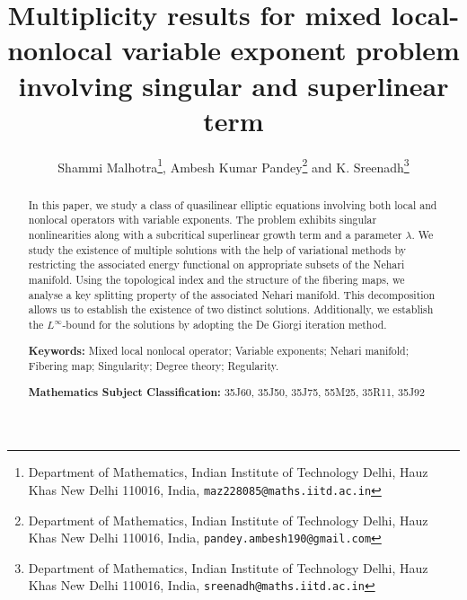 \documentclass[11pt]{article}
\title{Multiplicity results for mixed local-nonlocal variable exponent problem involving singular and superlinear term}
\author{Shammi Malhotra\thanks{Department of Mathematics, Indian Institute of Technology Delhi, Hauz Khas New Delhi 110016,  India, \texttt{maz228085@maths.iitd.ac.in}}, Ambesh Kumar Pandey\thanks{Department of Mathematics, Indian Institute of Technology Delhi, Hauz Khas New Delhi 110016,  India, \texttt{pandey.ambesh190@gmail.com}} and K. Sreenadh\thanks{Department of Mathematics, Indian Institute of Technology Delhi, Hauz Khas New Delhi 110016,  India, \texttt{sreenadh@maths.iitd.ac.in}}}
\date{}
\newcommand{\la} {\lambda}
\newcommand{\noi} {\noindent}
\begin{document}
 

\date{}
\maketitle     
 

\allowdisplaybreaks
 
 



 
 \begin{abstract}
\noi In this paper, we study a class of quasilinear elliptic equations involving both local and nonlocal operators with variable exponents. The problem exhibits singular nonlinearities along with a subcritical superlinear growth term and a parameter $\la$. We study the existence of multiple solutions with the help of variational methods by restricting the associated energy functional on appropriate subsets of the Nehari manifold. Using the topological index and the structure of the fibering maps, we analyse a key splitting property of the associated Nehari manifold. This decomposition allows us to establish the existence of two distinct solutions. Additionally, we establish the $L^\infty$-bound for the solutions by adopting the De Giorgi iteration method.

\medskip
\noi\textbf{Keywords:} Mixed local nonlocal operator; Variable exponents; Nehari manifold; Fibering map; Singularity; Degree theory; Regularity.

\medskip
\noi\textbf{Mathematics Subject Classification:} 35J60, 35J50, 35J75, 55M25, 35R11, 35J92
\end{abstract}
 
 
 
\end{document}
